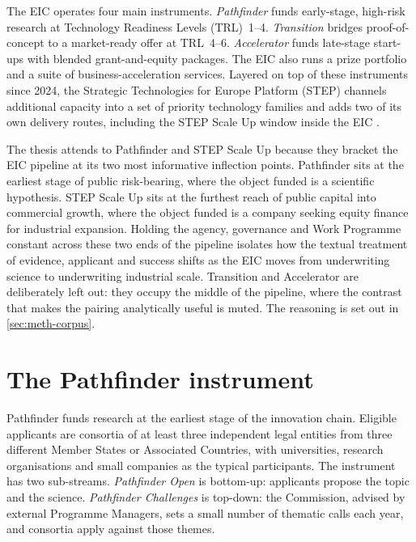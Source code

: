 The EIC operates four main instruments. \emph{Pathfinder} funds
early-stage, high-risk research at Technology Readiness Levels
(TRL)~1--4. \emph{Transition} bridges proof-of-concept to a
market-ready offer at TRL~4--6. \emph{Accelerator} funds late-stage
start-ups with blended grant-and-equity packages. The EIC also runs a
prize portfolio and a suite of business-acceleration services. Layered
on top of these instruments since 2024, the Strategic Technologies for
Europe Platform (STEP) channels additional capacity into a set of
priority technology families and adds two of its own delivery routes,
including the STEP Scale Up window inside the EIC \parencite{eu2024step}.

The thesis attends to Pathfinder and STEP Scale Up because they bracket
the EIC pipeline at its two most informative inflection points. Pathfinder
sits at the earliest stage of public risk-bearing, where the object
funded is a scientific hypothesis. STEP Scale Up sits at the
furthest reach of public capital into commercial growth, where the
object funded is a company seeking equity finance for industrial
expansion. Holding the agency, governance and Work Programme constant
across these two ends of the pipeline isolates how the textual
treatment of evidence, applicant and success shifts as the EIC moves
from underwriting science to underwriting industrial scale. Transition
and Accelerator are deliberately left out: they occupy the middle of
the pipeline, where the contrast that makes the pairing analytically
useful is muted. The reasoning is set out in
\cref{sec:meth-corpus}.

\section{The Pathfinder instrument}
\label{sec:bg-pathfinder}

Pathfinder funds research at the earliest stage of the innovation
chain. Eligible applicants are consortia of at least three independent
legal entities from three different Member States or Associated
Countries, with universities, research organisations and small
companies as the typical participants. The instrument has two
sub-streams. \emph{Pathfinder Open} is bottom-up: applicants propose
the topic and the science. \emph{Pathfinder Challenges} is top-down:
the Commission, advised by external Programme Managers, sets a small
number of thematic calls each year, and consortia apply against those
themes.

